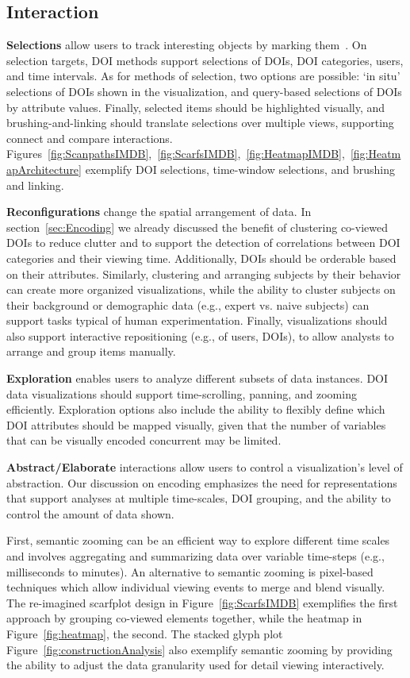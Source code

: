 \subsection{Interaction}
\label{sec:Interaction}

\textbf{Selections} allow users to track interesting objects by marking them~\cite{Yi07}. On selection targets, DOI methods support selections of DOIs, DOI categories, users, and time intervals.  As for methods of selection, two options are possible: `in situ' selections of DOIs shown in the visualization, and query-based selections of DOIs by attribute values. Finally, selected items should be highlighted visually, and brushing-and-linking should translate selections over multiple views, supporting connect and compare interactions. Figures~\ref{fig:ScanpathsIMDB},~\ref{fig:ScarfsIMDB},~\ref{fig:HeatmapIMDB},~\ref{fig:HeatmapArchitecture} exemplify DOI selections, time-window selections, and brushing and linking.

\textbf{Reconfigurations} change the spatial arrangement of data.  In section~\ref{sec:Encoding} we already discussed the benefit of clustering co-viewed DOIs to reduce clutter and to support the detection of correlations between DOI categories and their viewing time. Additionally, DOIs should be orderable based on their attributes. Similarly, clustering and arranging subjects by their behavior can create more organized visualizations, while the ability to cluster subjects on their background or demographic data (e.g., expert vs. naive subjects) can support tasks typical of human experimentation. Finally, visualizations should also support interactive repositioning (e.g., of users, DOIs), to allow analysts to arrange and group items manually.


\textbf{Exploration} enables users to analyze different subsets of data instances. DOI data visualizations should support time-scrolling, panning, and zooming efficiently. Exploration options also include the ability to flexibly define which DOI attributes should be mapped visually, given that the number of variables that can be visually encoded concurrent may be limited. 
	
\textbf{Abstract/Elaborate} interactions allow users to control a visualization's level of abstraction. Our discussion on encoding emphasizes the need for representations that support analyses at multiple time-scales, DOI grouping, and the ability to control the amount of data shown. 

First, semantic zooming can be an efficient way to explore different time scales and involves aggregating and summarizing data over variable time-steps (e.g., milliseconds to minutes). An alternative to semantic zooming is pixel-based techniques which allow individual viewing events to merge and blend visually\cite{keim2000designing}. The re-imagined scarfplot design in Figure~\ref{fig:ScarfsIMDB} exemplifies the first approach by grouping co-viewed elements together, while the heatmap in Figure~\ref{fig:heatmap}, the second. The stacked glyph plot Figure~\ref{fig:constructionAnalysis} also exemplify semantic zooming by providing the ability to adjust the data granularity used for detail viewing interactively.  

